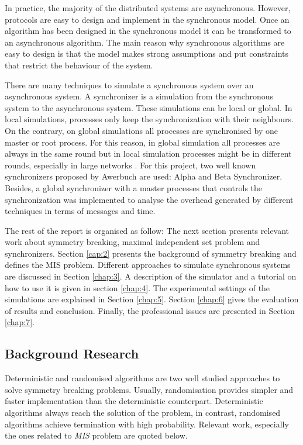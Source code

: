 In practice, the majority of the distributed systems are asynchronous. However, protocols are easy to design and implement in the synchronous model. Once an algorithm has been designed in the synchronous model it can be transformed to an asynchronous algorithm. The main reason why synchronous algorithms are easy to design is that the model makes strong assumptions and put constraints that restrict the behaviour of the system.

There are many techniques to simulate a synchronous system over an asynchronous system. A synchronizer is a simulation from the synchronous system to the asynchronous system. These simulations can be local or global. In local simulations, processes only keep the synchronization with their neighbours. On the contrary, on global simulations all processes are synchronised by one master or root process.  For this reason, in global simulation all processes are always in the same round but in local simulation processes might be in different rounds, especially in large networks \cite{attiya2004distributed}. For this project, two well known synchronizers proposed by Awerbuch \cite{awerbuch1985complexity} are used: Alpha and Beta Synchronizer. Besides, a global synchronizer with a master processes that controls the synchronization was implemented to analyse the overhead generated by different techniques in terms of messages and time.


The rest of the report is organised as follow: The next section presents relevant work about symmetry breaking, maximal independent set problem and synchronizers. Section \ref{cap:2} presents the background of symmetry breaking and defines the MIS problem. Different approaches to simulate synchronous systems are discussed in Section \ref{chap:3}. A description of the simulator and a tutorial on how to use it is given in section \ref{chap:4}. The experimental settings of the simulations are explained in Section \ref{chap:5}. Section \ref{chap:6} gives the evaluation of results and conclusion. Finally, the professional issues are presented in Section \ref{chap:7}. 

\subsection{Background Research}
 
Deterministic and randomised algorithms are two well studied approaches to solve symmetry breaking problems. Usually, randomisation provides simpler and faster implementation than the deterministic counterpart. Deterministic algorithms always reach the solution of the problem, in contrast, randomised algorithms achieve termination with high probability. Relevant work, especially the ones related to \textit{MIS} problem are quoted below.

